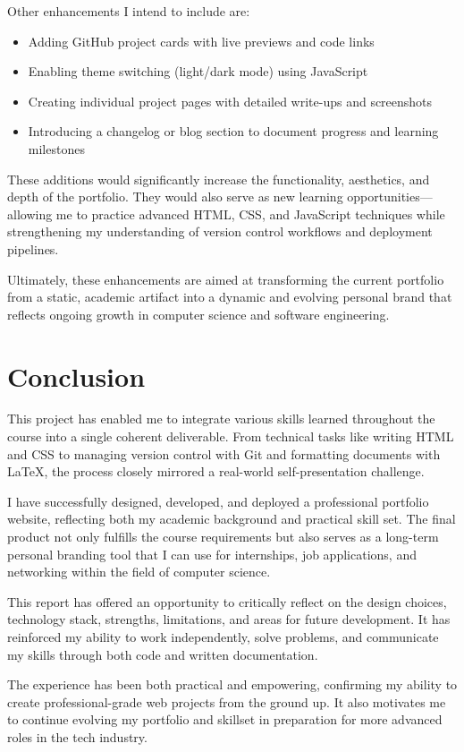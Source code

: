 \documentclass[11pt,a4paper]{article}
\begin{document}
Other enhancements I intend to include are:
\begin{itemize}
    \item Adding GitHub project cards with live previews and code links
    \item Enabling theme switching (light/dark mode) using JavaScript
    \item Creating individual project pages with detailed write-ups and screenshots
    \item Introducing a changelog or blog section to document progress and learning milestones
\end{itemize}

These additions would significantly increase the functionality, aesthetics, and depth of the portfolio. They would also serve as new learning opportunities—allowing me to practice advanced HTML, CSS, and JavaScript techniques while strengthening my understanding of version control workflows and deployment pipelines.

Ultimately, these enhancements are aimed at transforming the current portfolio from a static, academic artifact into a dynamic and evolving personal brand that reflects ongoing growth in computer science and software engineering.
\section*{Conclusion}

This project has enabled me to integrate various skills learned throughout the course into a single coherent deliverable. From technical tasks like writing HTML and CSS to managing version control with Git and formatting documents with LaTeX, the process closely mirrored a real-world self-presentation challenge. 

I have successfully designed, developed, and deployed a professional portfolio website, reflecting both my academic background and practical skill set. The final product not only fulfills the course requirements but also serves as a long-term personal branding tool that I can use for internships, job applications, and networking within the field of computer science.

This report has offered an opportunity to critically reflect on the design choices, technology stack, strengths, limitations, and areas for future development. It has reinforced my ability to work independently, solve problems, and communicate my skills through both code and written documentation.

The experience has been both practical and empowering, confirming my ability to create professional-grade web projects from the ground up. It also motivates me to continue evolving my portfolio and skillset in preparation for more advanced roles in the tech industry.
\end{document}
